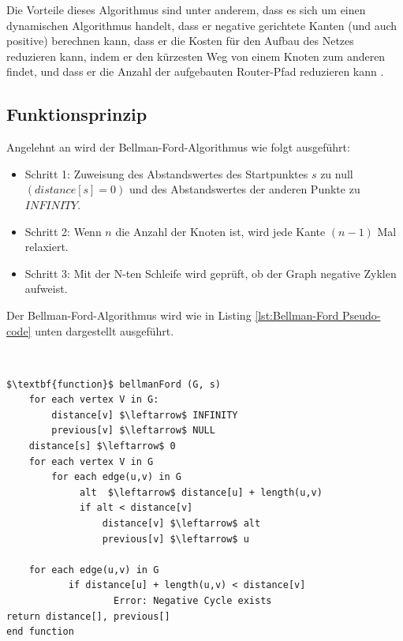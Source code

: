 Die Vorteile dieses Algorithmus sind unter anderem, dass es sich um einen dynamischen Algorithmus handelt, dass er negative gerichtete 
Kanten (und auch positive) berechnen kann, dass er die Kosten für den Aufbau des Netzes reduzieren kann, indem er den kürzesten Weg von einem 
Knoten zum anderen findet, und dass er die Anzahl der aufgebauten Router-Pfad reduzieren kann \cite{Abusalim2020}.

\subsection{Funktionsprinzip}

Angelehnt an \cite{Abusalim2020} wird der Bellman-Ford-Algorithmus wie folgt ausgeführt:
\\
\begin{itemize}
	\item Schritt 1: Zuweisung des Abstandswertes des Startpunktes $s$ zu null $(distance[s] = 0)$ und des Abstandswertes der anderen Punkte zu 
		$INFINITY$.
	\item Schritt 2: Wenn $n$ die Anzahl der Knoten ist, wird jede Kante $(n - 1)$ Mal relaxiert. 
	\item Schritt 3: Mit der N-ten Schleife wird geprüft, ob der Graph negative Zyklen aufweist.
\end{itemize}
Der Bellman-Ford-Algorithmus wird wie in Listing  \ref{lst:Bellman-Ford Pseudo-code} unten dargestellt ausgeführt.

\noindent \\
\begin{minipage}{1.0\textwidth} \small
\begin{lstlisting}[label=lst:Bellman-Ford]
$\textbf{function}$ bellmanFord (G, s)
	for each vertex V in G:
		distance[v] $\leftarrow$ INFINITY
		previous[v] $\leftarrow$ NULL
	distance[s] $\leftarrow$ 0
	for each vertex V in G
	    for each edge(u,v) in G
	         alt  $\leftarrow$ distance[u] + length(u,v)
	         if alt < distance[v]
	             distance[v] $\leftarrow$ alt
	             previous[v] $\leftarrow$ u
	 
	for each edge(u,v) in G
	       if distance[u] + length(u,v) < distance[v]
	               Error: Negative Cycle exists
return distance[], previous[]
end function
       
\end{lstlisting}
\label{lst:Bellman-Ford Pseudo-code}
\end{minipage}








